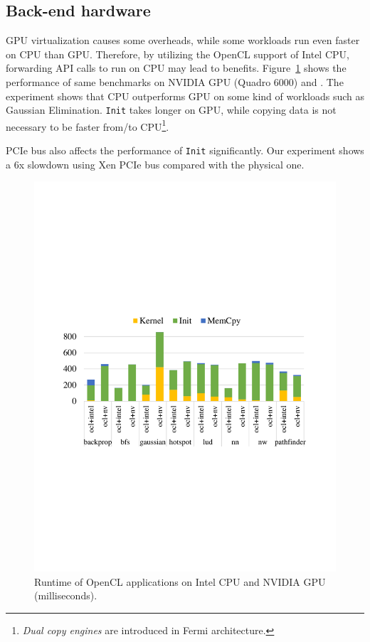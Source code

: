 	\subsection{Back-end hardware}
GPU virtualization causes some overheads, while some workloads run even faster on CPU than GPU.
Therefore, by utilizing the OpenCL support of Intel CPU, forwarding API calls to run on CPU
may lead to benefits. Figure~\ref{fig_hardware} shows the performance of same benchmarks on
NVIDIA GPU (Quadro 6000) and . The experiment shows that CPU outperforms
GPU on some kind of workloads such as Gaussian Elimination. \texttt{Init} takes longer on GPU,
while copying data is not necessary to be faster from/to CPU\footnote{\textit{Dual copy engines} are
introduced in Fermi architecture.}.

PCIe bus also affects the performance of \texttt{Init} significantly. Our experiment shows
a 6x slowdown using Xen PCIe bus compared with the physical one.

\begin{figure}[!th]
	\centering
	\includegraphics[width=\linewidth,trim={2cm 9cm 2cm 8cm},clip]{data/basic/hardware.pdf}
	\caption{{\footnotesize Runtime of OpenCL applications on Intel CPU and NVIDIA GPU (milliseconds). }}
	\label{fig_hardware} \end{figure}


